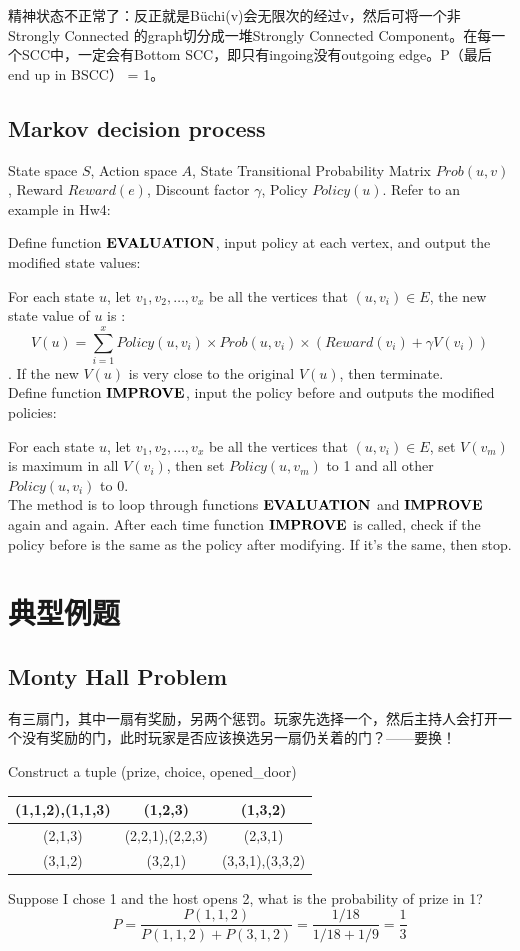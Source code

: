 \documentclass[12pt,a4paper]{ctexrep}
\begin{document}
精神状态不正常了：反正就是B\"uchi(v)会无限次的经过v，然后可将一个非Strongly Connected 的graph切分成一堆Strongly Connected Component。在每一个SCC中，一定会有Bottom SCC，即只有ingoing没有outgoing edge。P（最后end up in BSCC） = 1。

\subsection{Markov decision process}
State space $S$, Action space $A$, State Transitional Probability Matrix $Prob(u,v)$, Reward $Reward(e)$, Discount factor $\gamma$, Policy $Policy(u)$. Refer to an example in Hw4: 

Define function $\bold{EVALUATION}$, input policy at each vertex, and output the modified state values:

For each state $u$, let $v_1,v_2,\dots, v_x$ be all the vertices that $(u,v_i)\in E$, the new state value of $u$ is :\[V(u)=\sum_{i=1}^{x} Policy(u,v_i)\times Prob(u,v_i)\times (Reward(v_i)+\gamma V(v_i))\]. If the new $V(u)$ is very close to the original $V(u)$, then terminate.\\

Define function $\bold{IMPROVE}$, input the policy before and outputs the modified policies:

For each state $u$, let $v_1,v_2,\dots, v_x$ be all the vertices that $(u,v_i)\in E$, set $V(v_m)$ is maximum in all $V(v_i)$, then set $Policy(u,v_m)$ to 1 and all other $Policy(u,v_i)$ to 0. \\

The method is to loop through functions $\bold{EVALUATION}$ and $\bold{IMPROVE}$ again and again. After each time function $\bold{IMPROVE}$ is called, check if the policy before is the same as the policy after modifying. If it's the same, then stop.
\section{典型例题}
\subsection{Monty Hall Problem}
有三扇门，其中一扇有奖励，另两个惩罚。玩家先选择一个，然后主持人会打开一个没有奖励的门，此时玩家是否应该换选另一扇仍关着的门？——要换！

Construct a tuple (prize, choice, opened\_door)
\begin{center}
\begin{tabular}{|c|c|c|}
\hline
(1,1,2),(1,1,3) & (1,2,3) & (1,3,2)\\
\hline
(2,1,3) & (2,2,1),(2,2,3) & (2,3,1)\\
\hline
(3,1,2) & (3,2,1) & (3,3,1),(3,3,2)\\
\hline
\end{tabular}
\end{center}
Suppose I chose 1 and the host opens 2, what is the probability of prize in 1? \[P = \frac{P(1,1,2)}{P(1,1,2)+P(3,1,2)} = \frac{1/18}{1/18+1/9} = \frac{1}{3}\]
\end{document}
